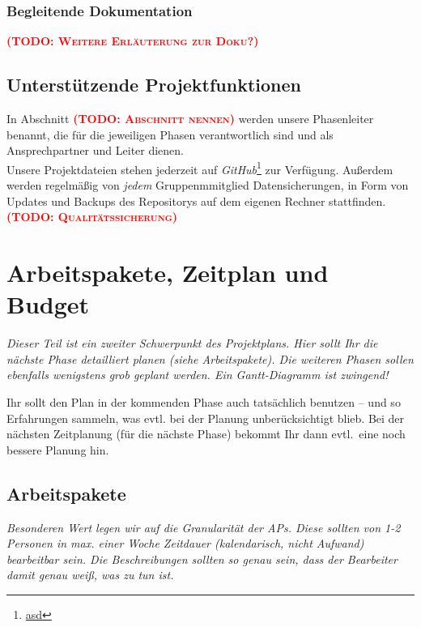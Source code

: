 \documentclass[fontsize=12pt,paper=a4,twoside]{scrartcl}
\newcommand{\todo}[1]{\textbf{\textsc{\textcolor{red}{(TODO: #1)}}}}
\begin{document}
\subsubsection{Begleitende Dokumentation}
\todo{Weitere Erläuterung zur Doku?}
\subsection{Unterstützende Projektfunktionen}
In Abschnitt \todo{Abschnitt nennen} werden unsere Phasenleiter benannt, die für die jeweiligen Phasen verantwortlich sind und als Ansprechpartner und Leiter dienen.\\
Unsere Projektdateien stehen jederzeit auf \emph{GitHub}\footnote{\url{asd}} zur Verfügung. Außerdem werden regelmäßig von \emph{jedem} Gruppenmmitglied Datensicherungen, in Form von Updates und Backups des Repositorys auf dem eigenen Rechner stattfinden.\\


\todo{Qualitätssicherung}


\section{Arbeitspakete, Zeitplan und Budget}

{\em Dieser Teil ist ein zweiter Schwerpunkt des Projektplans. Hier sollt Ihr die nächste Phase detailliert planen (siehe Arbeitspakete). Die weiteren Phasen sollen ebenfalls wenigstens grob geplant werden. Ein Gantt-Diagramm ist zwingend! 

Ihr sollt den Plan in der kommenden Phase auch tatsächlich benutzen -- und so
  Erfahrungen sammeln, was evtl. bei der Planung unberücksichtigt
  blieb. Bei der nächsten Zeitplanung (für die nächste Phase) bekommt
  Ihr dann evtl.\ eine noch bessere Planung hin.}

\subsection{Arbeitspakete}\label{aps}


{\em Besonderen Wert legen wir auf die Granularität der APs. Diese
  sollten von 1-2 Personen in max. einer Woche Zeitdauer (kalendarisch, nicht
  Aufwand) bearbeitbar sein. Die Beschreibungen sollten so genau sein,
  dass der Bearbeiter damit genau weiß, was zu tun ist.}
\end{document}
